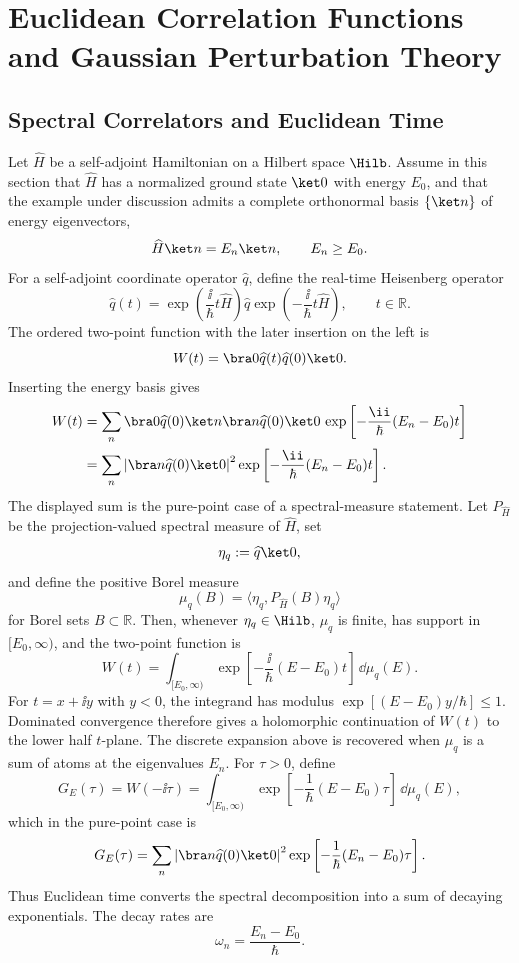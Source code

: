 \chapter{Euclidean Correlation Functions and Gaussian Perturbation Theory}
\label{ch:euclidean-correlation-functions-gaussian-perturbation}

\section{Spectral Correlators and Euclidean Time}

Let \(\widehat H\) be a self-adjoint Hamiltonian on a Hilbert space
\(\Hilb\). Assume in this section that \(\widehat H\) has a normalized
ground state \(\ket 0\) with energy \(E_0\), and that the example under
discussion admits a complete orthonormal basis \(\{\ket n\}\) of energy
eigenvectors,
\[
  \widehat H\ket n=E_n\ket n,\qquad E_n\ge E_0.
\]
For a self-adjoint coordinate operator \(\widehat q\), define the real-time
Heisenberg operator
\[
  \widehat q(t)
  =
  \exp\left(\frac{\ii}{\hbar}t\widehat H\right)
  \widehat q
  \exp\left(-\frac{\ii}{\hbar}t\widehat H\right),
  \qquad t\in\mathbb R.
\]
The ordered two-point function with the later insertion on the left is
\[
  W(t)=\bra 0\widehat q(t)\widehat q(0)\ket 0 .
\]
Inserting the energy basis gives
\[
\begin{aligned}
  W(t)
  &=
  \sum_n
  \bra 0\widehat q(0)\ket n
  \bra n\widehat q(0)\ket 0\,
  \exp\left[-\frac{\ii}{\hbar}(E_n-E_0)t\right]  \\
  &=
  \sum_n
  \left|\bra n\widehat q(0)\ket 0\right|^2
  \exp\left[-\frac{\ii}{\hbar}(E_n-E_0)t\right].
\end{aligned}
\]
The displayed sum is the pure-point case of a spectral-measure statement.
Let \(P_{\widehat H}\) be the projection-valued spectral measure of
\(\widehat H\), set
\[
\eta_q:=\widehat q\ket0,
\]
and define the positive Borel measure
\[
  \mu_q(B)=\langle \eta_q,P_{\widehat H}(B)\eta_q\rangle
\]
for Borel sets \(B\subset\mathbb R\).  Then, whenever
\(\eta_q\in\Hilb\), \(\mu_q\) is finite, has support in \([E_0,\infty)\),
and the two-point function is
\[
  W(t)=
  \int_{[E_0,\infty)}
  \exp\left[-\frac{\ii}{\hbar}(E-E_0)t\right]\,\dd\mu_q(E).
\]
For \(t=x+\ii y\) with \(y<0\), the integrand has modulus
\(\exp[(E-E_0)y/\hbar]\le1\).  Dominated convergence therefore gives a
holomorphic continuation of \(W(t)\) to the lower half \(t\)-plane.  The
discrete expansion above is recovered when \(\mu_q\) is a sum of atoms at
the eigenvalues \(E_n\).
For \(\tau>0\), define
\[
  G_E(\tau)
  =
  W(-\ii\tau)
  =
  \int_{[E_0,\infty)}
  \exp\left[-\frac{1}{\hbar}(E-E_0)\tau\right]\,\dd\mu_q(E),
\]
which in the pure-point case is
\[
  G_E(\tau)
  =
  \sum_n
  \left|\bra n\widehat q(0)\ket 0\right|^2
  \exp\left[-\frac{1}{\hbar}(E_n-E_0)\tau\right].
\]
Thus Euclidean time converts the spectral decomposition into a sum of
decaying exponentials. The decay rates are
\[
  \omega_n=\frac{E_n-E_0}{\hbar}.
\]

